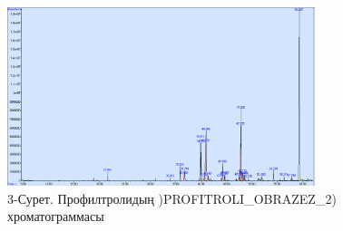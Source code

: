 \begin{figure}[H]
	\centering
	\includegraphics[width=0.8\textwidth]{media/pish/image15}
	\caption*{3-Сурет. Профилтролидың )PROFITROLI\_OBRAZEZ\_2)
	хроматограммасы}
\end{figure}


